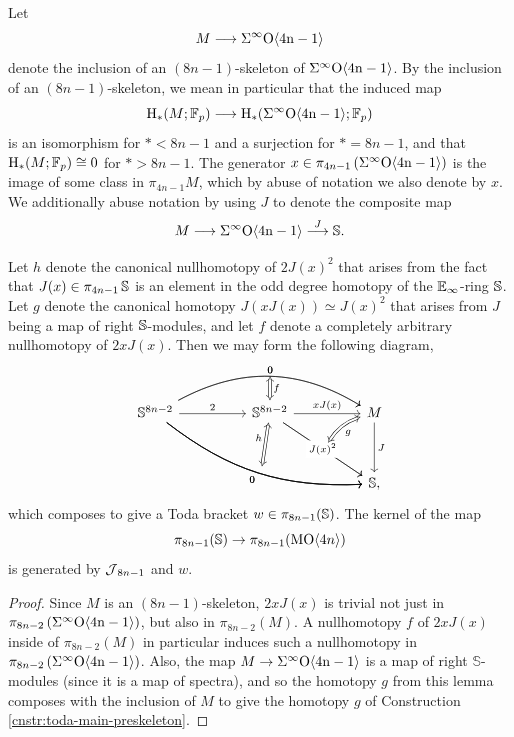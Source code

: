 \begin{dfn} \label{dfn:skeleton}
Let
	$$M \longrightarrow \Sigma^{\infty} \mathrm{O} \mathrm{\langle 4n-1 \rangle}$$
	denote the inclusion of an $(8n-1)$-skeleton of $\Sigma^{\infty} \mathrm{O} \mathrm{\langle 4n-1 \rangle}$. By the inclusion of an $(8n-1)$-skeleton, we mean in particular that the induced map
	$$\mathrm{H}_*(M;\operatorname{\mathbb{F}}_p) \longrightarrow \mathrm{H}_*(\Sigma^{\infty} \mathrm{O} \mathrm{\langle 4n-1 \rangle};\operatorname{\mathbb{F}}_p)$$
is an isomorphism for $* < 8n-1$ and a surjection for $* = 8n-1$, and that $\mathrm{H}_*(M;\operatorname{\mathbb{F}}_p) \cong 0$ for $* > 8n-1$.
The generator $x \in \pi_{4n-1} \left(\Sigma^{\infty} \mathrm{O \langle 4n-1\rangle} \right)$ is the image of some class in $\pi_{4n-1} M$, which by abuse of notation we also denote by $x$.  We additionally abuse notation by using $J$ to denote the composite map $$M \longrightarrow \Sigma^{\infty} \mathrm{O} \mathrm{\langle 4n-1 \rangle} \stackrel{J}{\longrightarrow} \mathbb{S}.$$
\end{dfn}

\begin{lem} \label{lem:toda-main}
Let $h$ denote the canonical nullhomotopy of $2J(x)^2$ that arises from the fact that $J(x) \in \pi_{4n-1} \operatorname{\mathbb{S}}$ is an element in the odd degree homotopy of the $\operatorname{\mathbb{E}}_{\infty}$-ring $\operatorname{\mathbb{S}}$.  Let $g$ denote the canonical homotopy $J(xJ(x))\simeq J(x)^2$ that arises from $J$ being a map of right $\operatorname{\mathbb{S}}$-modules, and let $f$ denote a completely arbitrary nullhomotopy of $2xJ(x)$.  Then we may form the following diagram,
$$
\begin{tikzcd}[column sep = huge]
\mathbb{S}^{8n-2} \arrow{r}{2}
\arrow[rrdd, bend right=20,""{name=D}] \arrow[rrdd, bend right=20,swap,"0"] \arrow[rr,bend left = 30,""{name=U},"0"]
\arrow[rrdd, bend right=20,""{name=D}] \arrow[rrdd, bend right=20,swap,"0"] \arrow[rr,bend left = 30,""{name=U},"0"]
& \mathbb{S}^{8n-2} \arrow[Leftrightarrow, from=D, "h"] \arrow[Leftrightarrow, from=U, "f"] \arrow{r}{xJ(x)} \arrow[rdd,""{name=MU},"J(x)^2" description] \arrow[rdd,swap, ""{name=MD},"J(x)^2" description]
& M \arrow{dd}{J}  \arrow[bend left=20,Leftrightarrow, from=MU, swap, "g"] \\ \\
& & \mathbb{S}, 
\end{tikzcd}
$$
which composes to give a Toda bracket $w \in \pi_{8n-1} (\operatorname{\mathbb{S}})$.
The kernel of the map
$$\pi_{8n-1} (\mathbb{S}) \to \pi_{8n-1} (\operatorname{\mathrm{MO}} \langle 4n \rangle)$$
is generated by $\operatorname{\mathcal{J}}_{8n-1}$ and $w$. 
\end{lem}

\begin{proof}
    Since $M$ is an $(8n-1)$-skeleton, $2xJ(x)$ is trivial not just in $\pi_{8n-2} \left(\Sigma^{\infty} \mathrm{O \langle 4n-1\rangle} \right)$, but also in $\pi_{8n-2} (M)$.  A nullhomotopy $f$ of $2x J(x)$ inside of $\pi_{8n-2} (M)$ in particular induces such a nullhomotopy in $\pi_{8n-2} \left( \Sigma^{\infty} \mathrm{O \langle 4n-1\rangle} \right)$.  Also, the map $M \to \Sigma^{\infty} \mathrm{O \langle 4n-1\rangle}$ is a map of right $\mathbb{S}$-modules (since it is a map of spectra), and so the homotopy $g$ from this lemma composes with the inclusion of $M$ to give the homotopy $g$ of Construction \ref{cnstr:toda-main-preskeleton}.
\end{proof}


